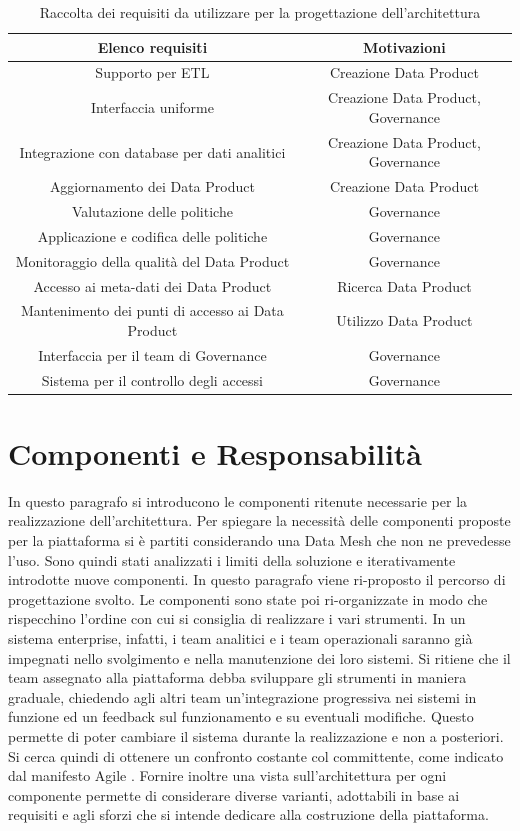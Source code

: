 \documentclass[12pt]{report}
\begin{document}
\begin{table}
    \centering
    \begin{tabular}{|c|c|}
    \hline
        Elenco requisiti & Motivazioni\\
        \hline
        Supporto per ETL & Creazione Data Product \\
        Interfaccia uniforme & Creazione Data Product, Governance\\
        Integrazione con database per dati analitici & Creazione Data Product, Governance \\
        Aggiornamento dei Data Product  & Creazione Data Product\\
        Valutazione delle politiche & Governance \\
        Applicazione e codifica delle politiche & Governance  \\
        Monitoraggio della qualità  del Data Product & Governance \\
        Accesso ai meta-dati dei Data Product & Ricerca Data Product \\
        Mantenimento dei punti di accesso ai Data Product & Utilizzo Data Product \\
        Interfaccia per il team di Governance & Governance \\
        Sistema per il controllo degli accessi & Governance \\
    \hline
    \end{tabular}
    \caption{Raccolta dei requisiti da utilizzare per la progettazione dell'architettura}
    \label{tab:requisitiTec}
\end{table}
\section{Componenti e Responsabilità}\label{componenti e responsabilità}
In questo paragrafo  si introducono le componenti ritenute necessarie per la realizzazione dell'architettura.
Per spiegare la necessità delle componenti proposte per la piattaforma si è partiti considerando una Data Mesh che non ne prevedesse l'uso. 
Sono quindi stati analizzati i limiti della soluzione e iterativamente introdotte nuove componenti.
In questo paragrafo viene ri-proposto il percorso di progettazione svolto.
Le componenti sono state poi ri-organizzate in modo che rispecchino l'ordine con cui si consiglia di realizzare i vari strumenti.
In un sistema enterprise, infatti, i team analitici e i team operazionali saranno già impegnati nello svolgimento e nella manutenzione dei loro sistemi.
Si ritiene che il team assegnato alla piattaforma debba sviluppare gli strumenti in maniera graduale, chiedendo agli altri team un'integrazione progressiva nei sistemi in funzione ed un feedback sul funzionamento e su eventuali modifiche.
Questo permette di poter cambiare il sistema durante la realizzazione e non a posteriori.
Si cerca quindi di ottenere un confronto costante col committente, come indicato dal manifesto Agile \cite{fowler2001agile}.
Fornire inoltre una vista sull'architettura per ogni componente permette di considerare diverse varianti, adottabili in base ai requisiti e agli sforzi che si intende dedicare alla costruzione della piattaforma.
\end{document}
